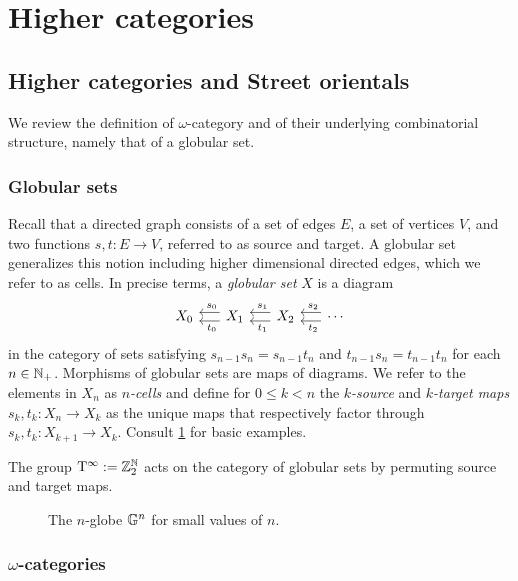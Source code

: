 
\appendix
\section{Higher categories}\label{s:categories}

\subsection{Higher categories and Street orientals}

We review the definition of $\omega$-category and of their underlying combinatorial structure, namely that of a globular set.

\subsubsection{Globular sets}

Recall that a directed graph consists of a set of edges $E$, a set of vertices $V$, and two functions $s,t \colon E \to V$, referred to as source and target.
A globular set generalizes this notion including higher dimensional directed edges, which we refer to as cells.
In precise terms, a \textit{globular set} $X$ is a diagram
\[
\begin{tikzcd}[column sep=15pt]
	X_0 & \arrow[l,"\ s_0"',shift right=3pt] \arrow[l,"\ t_0",shift left=3pt] X_1
	& \arrow[l,"\ s_1"',shift right=3pt] \arrow[l,"\ t_1",shift left=3pt] X_2
	& \arrow[l,"\ s_2"',shift right=3pt] \arrow[l,"\ t_2",shift left=3pt] \dotsb
\end{tikzcd}
\]
in the category of sets satisfying $s_{n-1}s_n = s_{n-1}t_n$ and $t_{n-1}s_n = t_{n-1}t_n$ for each $n \in \mathbb{N}_+$.
Morphisms of globular sets are maps of diagrams.
We refer to the elements in $X_n$ as \textit{$n$-cells} and define for $0 \leq k < n$ the \textit{$k$-source} and \textit{$k$-target maps} $s_k,t_k \colon X_n \to X_k$ as the unique maps that respectively factor through $s_k,t_k \colon X_{k+1} \to X_k$.
Consult \cref{f:globes} for basic examples.

The group $\mathrm{T}^\infty := \mathbb{Z}_2^\mathbb{N}$ acts on the category of globular sets by permuting source and target maps.

\begin{figure}
	
	\caption{The $n$-globe $\mathbb{G}^n$ for small values of $n$.}
	\label{f:globes}
\end{figure}

\subsubsection{$\omega$-categories}

